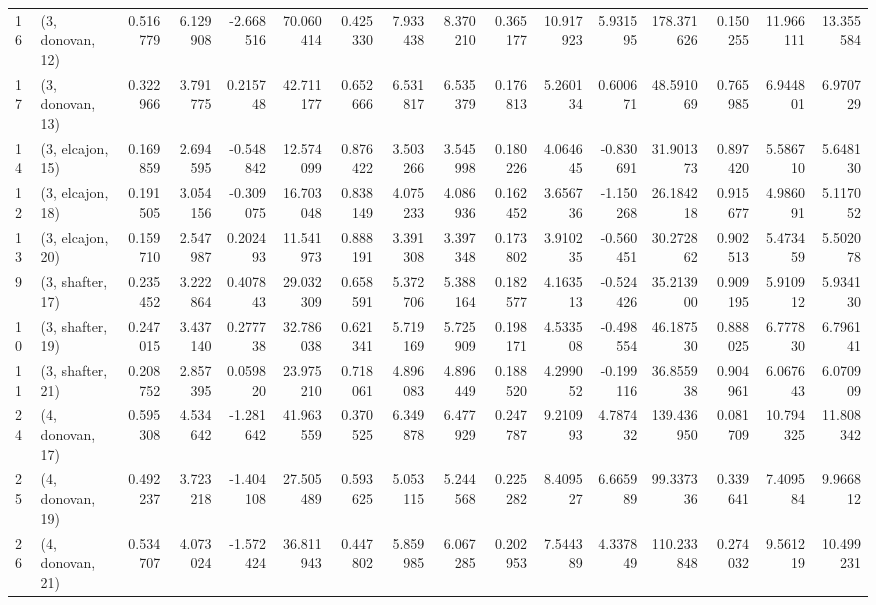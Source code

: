 \begin{tabular}{llrrrrrrrrrrrrrr}
16 &  (3, donovan, 12) &   0.516779 &  6.129908 & -2.668516 &  70.060414 &  0.425330 &   7.933438 &  8.370210 &  0.365177 &  10.917923 &  5.931595 &  178.371626 &  0.150255 &  11.966111 &  13.355584 \\
17 &  (3, donovan, 13) &   0.322966 &  3.791775 &  0.215748 &  42.711177 &  0.652666 &   6.531817 &  6.535379 &  0.176813 &   5.260134 &  0.600671 &   48.591069 &  0.765985 &   6.944801 &   6.970729 \\
14 &  (3, elcajon, 15) &   0.169859 &  2.694595 & -0.548842 &  12.574099 &  0.876422 &   3.503266 &  3.545998 &  0.180226 &   4.064645 & -0.830691 &   31.901373 &  0.897420 &   5.586710 &   5.648130 \\
12 &  (3, elcajon, 18) &   0.191505 &  3.054156 & -0.309075 &  16.703048 &  0.838149 &   4.075233 &  4.086936 &  0.162452 &   3.656736 & -1.150268 &   26.184218 &  0.915677 &   4.986091 &   5.117052 \\
13 &  (3, elcajon, 20) &   0.159710 &  2.547987 &  0.202493 &  11.541973 &  0.888191 &   3.391308 &  3.397348 &  0.173802 &   3.910235 & -0.560451 &   30.272862 &  0.902513 &   5.473459 &   5.502078 \\
9  &  (3, shafter, 17) &   0.235452 &  3.222864 &  0.407843 &  29.032309 &  0.658591 &   5.372706 &  5.388164 &  0.182577 &   4.163513 & -0.524426 &   35.213900 &  0.909195 &   5.910912 &   5.934130 \\
10 &  (3, shafter, 19) &   0.247015 &  3.437140 &  0.277738 &  32.786038 &  0.621341 &   5.719169 &  5.725909 &  0.198171 &   4.533508 & -0.498554 &   46.187530 &  0.888025 &   6.777830 &   6.796141 \\
11 &  (3, shafter, 21) &   0.208752 &  2.857395 &  0.059820 &  23.975210 &  0.718061 &   4.896083 &  4.896449 &  0.188520 &   4.299052 & -0.199116 &   36.855938 &  0.904961 &   6.067643 &   6.070909 \\
24 &  (4, donovan, 17) &   0.595308 &  4.534642 & -1.281642 &  41.963559 &  0.370525 &   6.349878 &  6.477929 &  0.247787 &   9.210993 &  4.787432 &  139.436950 &  0.081709 &  10.794325 &  11.808342 \\
25 &  (4, donovan, 19) &   0.492237 &  3.723218 & -1.404108 &  27.505489 &  0.593625 &   5.053115 &  5.244568 &  0.225282 &   8.409527 &  6.665989 &   99.337336 &  0.339641 &   7.409584 &   9.966812 \\
26 &  (4, donovan, 21) &   0.534707 &  4.073024 & -1.572424 &  36.811943 &  0.447802 &   5.859985 &  6.067285 &  0.202953 &   7.544389 &  4.337849 &  110.233848 &  0.274032 &   9.561219 &  10.499231 \\

\end{tabular}

